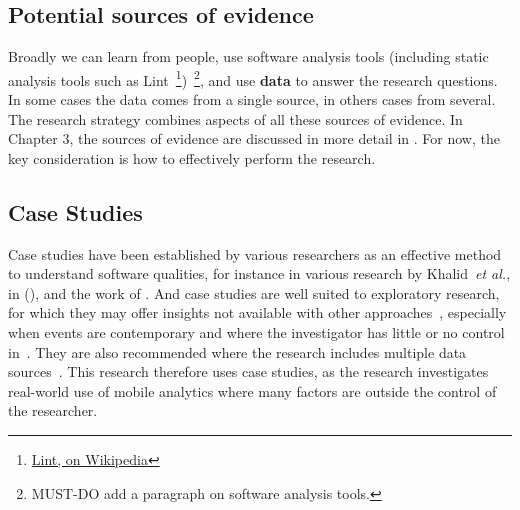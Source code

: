 \subsection{Potential sources of evidence}
Broadly we can learn from people, use software analysis tools (including static analysis tools such as Lint~\footnote{\href{https://en.wikipedia.org/wiki/Lint\_(software)}{Lint, on Wikipedia}})~\footnote{MUST-DO add a paragraph on software analysis tools.}, and use \textbf{data} to answer the research questions. In some cases the data comes from a single source, in others cases from several. The research strategy combines aspects of all these sources of evidence. In Chapter 3, the sources of evidence are discussed in more detail in \href{sec:potential-sources-of-evidence}{}. For now, the key consideration is how to effectively perform the research.

\subsection{Case Studies}
Case studies have been established by various researchers as an effective method to understand software qualities, for instance in various research by Khalid~\emph{et al.}, in (\citeyear{khalid2014_prioritizing_the_devices_to_test_your_app_on_casestudy_android_games, khalid2015_what_do_mobile_app_users_complain_about, khalid2016_examining_the_relationship_between_findbugs_warnings_and_app_ratings}), and the work of \citet{martinez_fernandez2019_continuously_assessing_and_improving_software_quality_with_software_analytics_tools}. And case studies are well suited to exploratory research, for which they may offer insights not available with other approaches~\citep{rowley2002_using_case_studies_in_research}, especially when events are contemporary and where the investigator has little or no control in~\citep[Chapter 1]{yin2018_case_study_research_and_applications_6th_edition}. They are also recommended where the research includes multiple data sources~\citep{rowley2002_using_case_studies_in_research}. This research therefore uses case studies, as the research investigates real-world use of mobile analytics where many factors are outside the control of the researcher.


